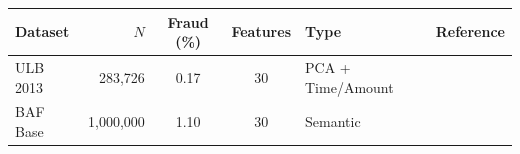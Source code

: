 \begin{tabularx}{\linewidth}{@{}l r c c X l@{}}
\toprule
Dataset & $N$ & Fraud (\%) & Features & Type & Reference \\
\midrule
ULB 2013 & 283,726 & 0.17 & 30 & PCA + Time/Amount & \citet{dalpozzolo2017realistic} \\
BAF Base & 1,000,000 & 1.10 & 30 & Semantic & \citet{jesus2022turning} \\
\bottomrule
\end{tabularx}
